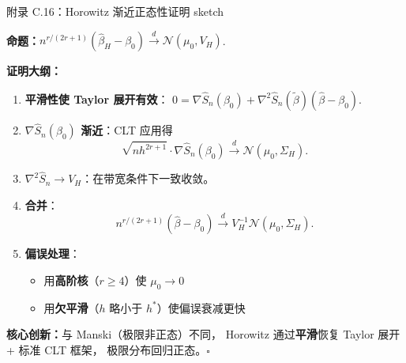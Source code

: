 \documentclass[aspectratio=169, 10pt]{beamer}
\begin{document}
\begin{frame}{附录 C.16：Horowitz 渐近正态性证明 sketch}
  \hypertarget{proof-c16}{}

  \textbf{命题：}$n^{r/(2r+1)} (\hat\beta_H - \beta_0) \overset{d}{\to} \mathcal{N}(\mu_0, V_H)$.

  \textbf{证明大纲：}
  \begin{enumerate}\setlength{\itemsep}{1pt}
    \item \textbf{平滑性使 Taylor 展开有效}：
    $0 = \nabla \hat S_n(\beta_0) + \nabla^2 \hat S_n(\tilde\beta)(\hat\beta - \beta_0)$.

    \item \textbf{$\nabla \hat S_n(\beta_0)$ 渐近}：CLT 应用得
    $$\sqrt{nh^{2r+1}} \cdot \nabla \hat S_n(\beta_0) \overset{d}{\to} \mathcal{N}(\mu_0, \Sigma_H).$$

    \item \textbf{$\nabla^2 \hat S_n \to V_H$}：在带宽条件下一致收敛。

    \item \textbf{合并}：
    $$n^{r/(2r+1)} (\hat\beta - \beta_0) \overset{d}{\to} V_H^{-1} \mathcal{N}(\mu_0, \Sigma_H).$$

    \item \textbf{偏误处理}：
    \begin{itemize}\setlength{\itemsep}{1pt}
      \item 用\textbf{高阶核}（$r \geq 4$）使 $\mu_0 \to 0$
      \item 用\textbf{欠平滑}（$h$ 略小于 $h^{*}$）使偏误衰减更快
    \end{itemize}
  \end{enumerate}

  \textbf{核心创新：}与 Manski（极限非正态）不同，
  Horowitz 通过\textbf{平滑}恢复 Taylor 展开 + 标准 CLT 框架，
  极限分布回归正态。$\square$
  \hfill{\scriptsize\hyperlink{main-c16}{}}

\end{frame}
\end{document}
